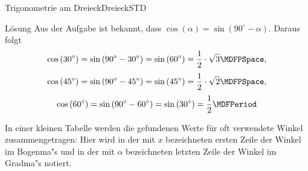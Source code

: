 \begin{MXContent}{Trigonometrie am Dreieck}{Dreieck}{STD}
\begin{MExercise}
\begin{MHint}{L\"osung}
Aus der Aufgabe  ist bekannt, dass $\cos\left(\alpha\right)= \sin\left(90^\circ-\alpha\right)$.
Daraus folgt
\[
\cos\left(30^\circ\right)=\sin\left(90^\circ-30^\circ\right)=\sin\left(60^\circ\right)=\frac{1}{2}\cdot\sqrt{3} \MDFPSpace, \]
\[\cos\left(45^\circ\right)=\sin\left(90^\circ-45^\circ\right)=\sin\left(45^\circ\right)=\frac{1}{2}\cdot\sqrt{2} \MDFPSpace, \]
\[\cos\left(60^\circ\right)=\sin\left(90^\circ-60^\circ\right)=\sin\left(30^\circ\right)=\frac{1}{2} \MDFPeriod\]
\end{MHint}
\end{MExercise}

In einer kleinen Tabelle werden die gefundenen Werte f\"ur oft verwendete Winkel 
zusammengetragen:
Hier wird in der mit $x$ bezeichneten ersten Zeile der Winkel im Bogenma"s und 
in der mit $\alpha$ bezeichneten letzten Zeile der Winkel im Gradma"s notiert.


\end{MXContent}
